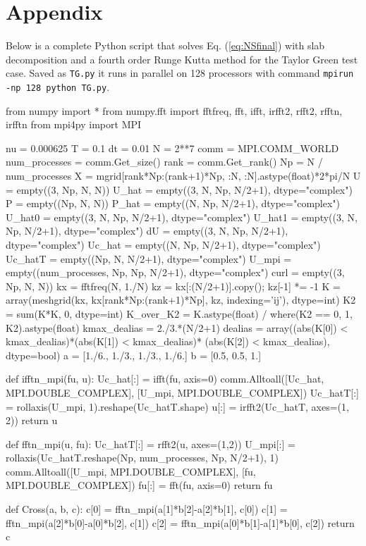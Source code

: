 \documentclass[11pt, oneside]{article}
\newcommand{\inpyth}{\lstinline[keywordstyle={}, basicstyle=\ttfamily]} %[]%
\begin{document}
\section*{Appendix}
\label{sec:appendix}
Below is a complete Python script that solves Eq. (\ref{eq:NSfinal}) with slab decomposition and a fourth order Runge Kutta method for the Taylor Green test case. Saved as \inpyth{TG.py} it runs in parallel on 128 processors with command \inpyth{mpirun -np 128 python TG.py}.
\begin{python}
from numpy import *
from numpy.fft import fftfreq, fft, ifft, irfft2, rfft2, rfftn, irfftn
from mpi4py import MPI

nu = 0.000625
T = 0.1
dt = 0.01
N = 2**7
comm = MPI.COMM_WORLD
num_processes = comm.Get_size()
rank = comm.Get_rank()
Np = N / num_processes
X = mgrid[rank*Np:(rank+1)*Np, :N, :N].astype(float)*2*pi/N
U     = empty((3, Np, N, N))
U_hat = empty((3, N, Np, N/2+1), dtype="complex")
P     = empty((Np, N, N))
P_hat = empty((N, Np, N/2+1), dtype="complex")
U_hat0  = empty((3, N, Np, N/2+1), dtype="complex")
U_hat1  = empty((3, N, Np, N/2+1), dtype="complex")
dU      = empty((3, N, Np, N/2+1), dtype="complex")
Uc_hat  = empty((N, Np, N/2+1), dtype="complex")
Uc_hatT = empty((Np, N, N/2+1), dtype="complex")
U_mpi   = empty((num_processes, Np, Np, N/2+1), dtype="complex")
curl    = empty((3, Np, N, N))
kx = fftfreq(N, 1./N)
kz = kx[:(N/2+1)].copy(); kz[-1] *= -1
K = array(meshgrid(kx, kx[rank*Np:(rank+1)*Np], kz, indexing='ij'), dtype=int)
K2 = sum(K*K, 0, dtype=int)
K_over_K2 = K.astype(float) / where(K2 == 0, 1, K2).astype(float)
kmax_dealias = 2./3.*(N/2+1)
dealias = array((abs(K[0]) < kmax_dealias)*(abs(K[1]) < kmax_dealias)*
                (abs(K[2]) < kmax_dealias), dtype=bool)
a = [1./6., 1./3., 1./3., 1./6.]
b = [0.5, 0.5, 1.]

def ifftn_mpi(fu, u):
    Uc_hat[:] = ifft(fu, axis=0)
    comm.Alltoall([Uc_hat, MPI.DOUBLE_COMPLEX], [U_mpi, MPI.DOUBLE_COMPLEX])
    Uc_hatT[:] = rollaxis(U_mpi, 1).reshape(Uc_hatT.shape)
    u[:] = irfft2(Uc_hatT, axes=(1, 2))
    return u

def fftn_mpi(u, fu):
    Uc_hatT[:] = rfft2(u, axes=(1,2))
    U_mpi[:] = rollaxis(Uc_hatT.reshape(Np, num_processes, Np, N/2+1), 1)
    comm.Alltoall([U_mpi, MPI.DOUBLE_COMPLEX], [fu, MPI.DOUBLE_COMPLEX])
    fu[:] = fft(fu, axis=0)
    return fu

def Cross(a, b, c):
    c[0] = fftn_mpi(a[1]*b[2]-a[2]*b[1], c[0])
    c[1] = fftn_mpi(a[2]*b[0]-a[0]*b[2], c[1])
    c[2] = fftn_mpi(a[0]*b[1]-a[1]*b[0], c[2])
    return c


\end{python}
\end{document}
